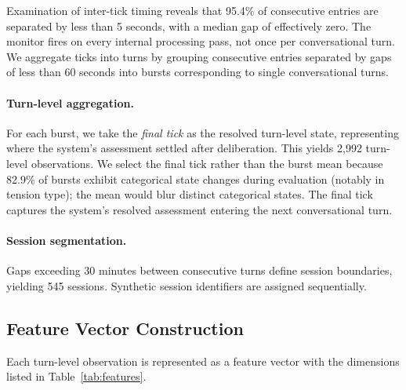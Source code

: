 \documentclass[twoside,11pt]{article}
\begin{document}
Examination of inter-tick timing reveals that 95.4\% of consecutive entries are
separated by less than 5 seconds, with a median gap of effectively zero. The
monitor fires on every internal processing pass, not once per conversational
turn. We aggregate ticks into turns by grouping consecutive entries separated by
gaps of less than 60 seconds into bursts corresponding to single conversational
turns.

\paragraph{Turn-level aggregation.} For each burst, we take the \emph{final
tick} as the resolved turn-level state, representing where the system's
assessment settled after deliberation. This yields 2,992 turn-level
observations. We select the final tick rather than the burst mean because
82.9\% of bursts exhibit categorical state changes during evaluation (notably
in tension type); the mean would blur distinct categorical states. The final
tick captures the system's resolved assessment entering the next conversational
turn.

\paragraph{Session segmentation.} Gaps exceeding 30 minutes between consecutive
turns define session boundaries, yielding 545 sessions. Synthetic session
identifiers are assigned sequentially.

\subsection{Feature Vector Construction}
\label{sec:method-features}

Each turn-level observation is represented as a feature vector with the
dimensions listed in Table~\ref{tab:features}.
\end{document}
